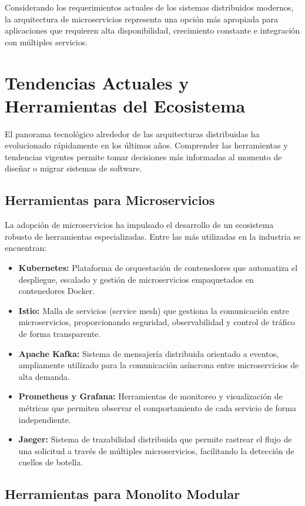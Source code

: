 \documentclass[12pt,a4paper]{article}
\begin{document}
Considerando los requerimientos actuales de los sistemas distribuidos modernos, la arquitectura de microservicios representa una opción más apropiada para aplicaciones que requieren alta disponibilidad, crecimiento constante e integración con múltiples servicios.


\section{Tendencias Actuales y Herramientas del Ecosistema}

El panorama tecnológico alrededor de las arquitecturas distribuidas ha evolucionado rápidamente en los últimos años. Comprender las herramientas y tendencias vigentes permite tomar decisiones más informadas al momento de diseñar o migrar sistemas de software.

\subsection{Herramientas para Microservicios}

La adopción de microservicios ha impulsado el desarrollo de un ecosistema robusto de herramientas especializadas. Entre las más utilizadas en la industria se encuentran:

\begin{itemize}
\item \textbf{Kubernetes:} Plataforma de orquestación de contenedores que automatiza el despliegue, escalado y gestión de microservicios empaquetados en contenedores Docker.
\item \textbf{Istio:} Malla de servicios (service mesh) que gestiona la comunicación entre microservicios, proporcionando seguridad, observabilidad y control de tráfico de forma transparente.
\item \textbf{Apache Kafka:} Sistema de mensajería distribuida orientado a eventos, ampliamente utilizado para la comunicación asíncrona entre microservicios de alta demanda.
\item \textbf{Prometheus y Grafana:} Herramientas de monitoreo y visualización de métricas que permiten observar el comportamiento de cada servicio de forma independiente.
\item \textbf{Jaeger:} Sistema de trazabilidad distribuida que permite rastrear el flujo de una solicitud a través de múltiples microservicios, facilitando la detección de cuellos de botella.
\end{itemize}

\subsection{Herramientas para Monolito Modular}
\end{document}
